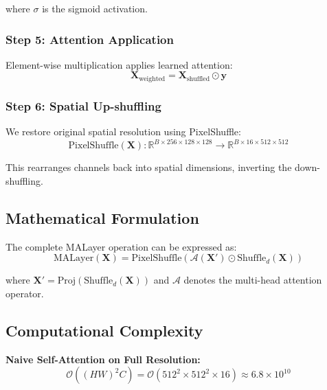 \documentclass[conference]{IEEEtran}
\begin{document}
where $\sigma$ is the sigmoid activation.

\subsubsection{Step 5: Attention Application}

Element-wise multiplication applies learned attention:
\begin{equation}
\mathbf{X}_{\text{weighted}} = \mathbf{X}_{\text{shuffled}} \odot \mathbf{y}
\end{equation}

\subsubsection{Step 6: Spatial Up-shuffling}

We restore original spatial resolution using PixelShuffle:
\begin{equation}
\text{PixelShuffle}(\mathbf{X}) : \mathbb{R}^{B \times 256 \times 128 \times 128} \rightarrow \mathbb{R}^{B \times 16 \times 512 \times 512}
\end{equation}

This rearranges channels back into spatial dimensions, inverting the down-shuffling.

\subsection{Mathematical Formulation}

The complete MALayer operation can be expressed as:
\begin{equation}
\text{MALayer}(\mathbf{X}) = \text{PixelShuffle}\left(\mathcal{A}(\mathbf{X}') \odot \text{Shuffle}_d(\mathbf{X})\right)
\end{equation}

where $\mathbf{X}' = \text{Proj}(\text{Shuffle}_d(\mathbf{X}))$ and $\mathcal{A}$ denotes the multi-head attention operator.

\subsection{Computational Complexity}

\textbf{Naive Self-Attention on Full Resolution:}
\begin{equation}
\mathcal{O}((HW)^2 C) = \mathcal{O}(512^2 \times 512^2 \times 16) \approx 6.8 \times 10^{10}
\end{equation}
\end{document}
